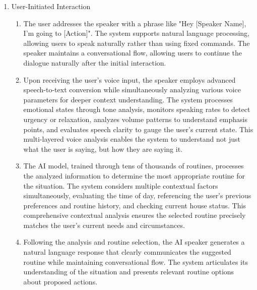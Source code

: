 \documentclass[conference]{IEEEtran}
\begin{document}
\begin{enumerate}[label=\arabic*]
    \item User-Initiated Interaction\par
    \vspace{0.3em}

    \begin{enumerate}[label=\arabic*)]
        \item The user addresses the speaker with a phrase like "Hey [Speaker Name], I'm going to [Action]". The system supports natural language processing, allowing users to speak naturally rather than using fixed commands. The speaker maintains a conversational flow, allowing users to continue the dialogue naturally after the initial interaction.

        \vspace{0.5em}

        \item Upon receiving the user's voice input, the speaker employs advanced speech-to-text conversion while simultaneously analyzing various voice parameters for deeper context understanding. The system processes emotional states through tone analysis, monitors speaking rates to detect urgency or relaxation, analyzes volume patterns to understand emphasis points, and evaluates speech clarity to gauge the user's current state. This multi-layered voice analysis enables the system to understand not just what the user is saying, but how they are saying it.

        \vspace{0.5em}

        \item The AI model, trained through tens of thousands of routines, processes the analyzed information to determine the most appropriate routine for the situation. The system considers multiple contextual factors simultaneously, evaluating the time of day, referencing the user's previous preferences and routine history, and checking current house status. This comprehensive contextual analysis ensures the selected routine precisely matches the user's current needs and circumstances.

        \vspace{0.5em}

        \item Following the analysis and routine selection, the AI speaker generates a natural language response that clearly communicates the suggested routine while maintaining conversational flow. The system articulates its understanding of the situation and presents relevant routine options about proposed actions. 


\end{enumerate}
\end{enumerate}
\end{document}
